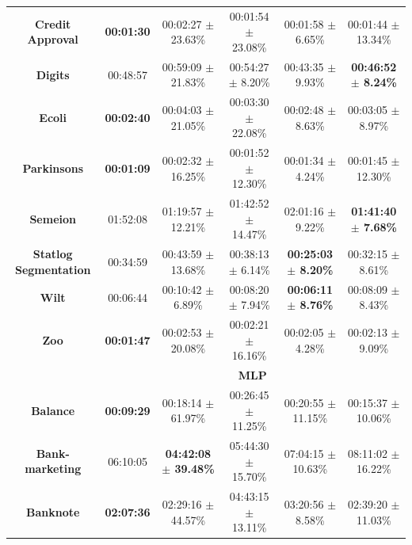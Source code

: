 \documentclass[iicol]{sn-jnl}
\theoremstyle{thmstyleone}%
\theoremstyle{thmstyletwo}%
\theoremstyle{thmstylethree}%
\begin{document}
\begin{table}
{\begin{tabular}{cccccc}
\textbf{Credit   Approval}      & \textbf{00:01:30} & 00:02:27 $\pm$ 23.63\%          & 00:01:54 $\pm$ 23.08\%     & 00:01:58 $\pm$ 6.65\%          & 00:01:44 $\pm$ 13.34\%          \\
\textbf{Digits}                 & 00:48:57          & 00:59:09 $\pm$ 21.83\%          & 00:54:27 $\pm$ 8.20\%      & 00:43:35 $\pm$ 9.93\%          & \textbf{00:46:52 $\pm$ 8.24\%}  \\
\textbf{Ecoli}                  & \textbf{00:02:40} & 00:04:03 $\pm$ 21.05\%          & 00:03:30 $\pm$ 22.08\%     & 00:02:48 $\pm$ 8.63\%          & 00:03:05 $\pm$ 8.97\%           \\
\textbf{Parkinsons}             & \textbf{00:01:09} & 00:02:32 $\pm$ 16.25\%          & 00:01:52 $\pm$ 12.30\%     & 00:01:34 $\pm$ 4.24\%          & 00:01:45 $\pm$ 12.30\%          \\
\textbf{Semeion}                & 01:52:08          & 01:19:57 $\pm$ 12.21\%          & 01:42:52 $\pm$ 14.47\%     & 02:01:16 $\pm$ 9.22\%          & \textbf{01:41:40 $\pm$ 7.68\%}  \\
\textbf{Statlog   Segmentation} & 00:34:59          & 00:43:59 $\pm$ 13.68\%          & 00:38:13 $\pm$ 6.14\%      & \textbf{00:25:03 $\pm$ 8.20\%} & 00:32:15 $\pm$ 8.61\%           \\
\textbf{Wilt}                   & 00:06:44          & 00:10:42 $\pm$ 6.89\%           & 00:08:20 $\pm$ 7.94\%      & \textbf{00:06:11 $\pm$ 8.76\%} & 00:08:09 $\pm$ 8.43\%           \\
\textbf{Zoo}                    & \textbf{00:01:47} & 00:02:53 $\pm$ 20.08\%          & 00:02:21 $\pm$ 16.16\%     & 00:02:05 $\pm$ 4.28\%          & 00:02:13 $\pm$ 9.09\%           \\ \hline
                                & \multicolumn{5}{c}{\textbf{MLP}}                                                                                                    \\ \hline
\textbf{Balance}                & \textbf{00:09:29} & 00:18:14 $\pm$ 61.97\%          & 00:26:45 $\pm$ 11.25\%     & 00:20:55 $\pm$ 11.15\%         & 00:15:37 $\pm$ 10.06\%          \\
\textbf{Bank-marketing}         & 06:10:05          & \textbf{04:42:08 $\pm$ 39.48\%} & 05:44:30 $\pm$ 15.70\%     & 07:04:15 $\pm$ 10.63\%         & 08:11:02 $\pm$ 16.22\%          \\
\textbf{Banknote}               & \textbf{02:07:36} & 02:29:16 $\pm$ 44.57\%          & 04:43:15 $\pm$ 13.11\%     & 03:20:56 $\pm$ 8.58\%          & 02:39:20 $\pm$ 11.03\%          \\

\end{tabular}}
\end{table}
\end{document}
